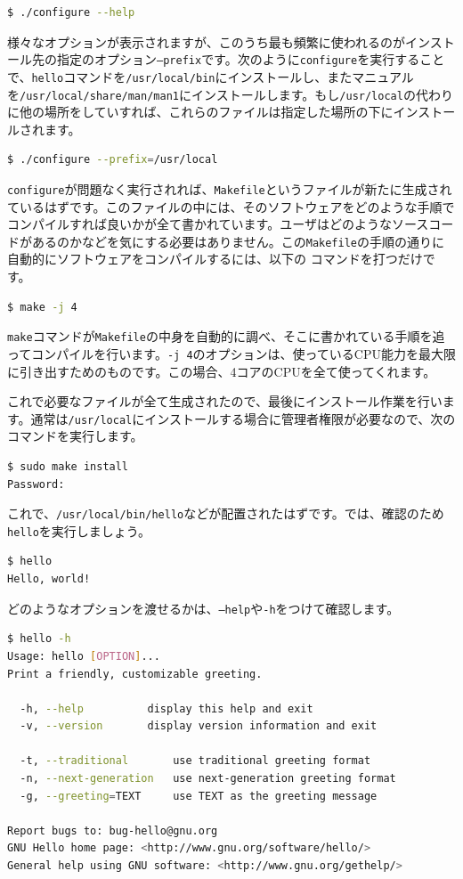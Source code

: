 \begin{lstlisting}[language=bash]
$ ./configure --help
\end{lstlisting}

様々なオプションが表示されますが、このうち最も頻繁に使われるのがインストール先の指定のオプション\texttt{--prefix}です。次のように\texttt{configure}を実行することで、\texttt{hello}コマンドを\texttt{/usr/local/bin}にインストールし、またマニュアルを\texttt{/usr/local/share/man/man1}にインストールします。もし\texttt{/usr/local}の代わりに他の場所をしていすれば、これらのファイルは指定した場所の下にインストールされます。
\begin{lstlisting}[language=bash]
$ ./configure --prefix=/usr/local
\end{lstlisting} 

\texttt{configure}が問題なく実行されれば、\texttt{Makefile}というファイルが新たに生成されているはずです。このファイルの中には、そのソフトウェアをどのような手順でコンパイルすれば良いかが全て書かれています。ユーザはどのようなソースコードがあるのかなどを気にする必要はありません。この\texttt{Makefile}の手順の通りに自動的にソフトウェアをコンパイルするには、以下の
コマンドを打つだけです。

\begin{lstlisting}[language=bash]
$ make -j 4
\end{lstlisting} 

\texttt{make}コマンドが\texttt{Makefile}の中身を自動的に調べ、そこに書かれている手順を追ってコンパイルを行います。\texttt{-j 4}のオプションは、使っているCPU能力を最大限に引き出すためのものです。この場合、4コアのCPUを全て使ってくれます。

これで必要なファイルが全て生成されたので、最後にインストール作業を行います。通常は\texttt{/usr/local}にインストールする場合に管理者権限が必要なので、次のコマンドを実行します。

\begin{lstlisting}[language=bash]
$ sudo make install
Password:
\end{lstlisting}

これで、\texttt{/usr/local/bin/hello}などが配置されたはずです。では、確認のため\texttt{hello}を実行しましょう。 
\begin{lstlisting}[language=bash]
$ hello
Hello, world!
\end{lstlisting}

どのようなオプションを渡せるかは、\texttt{--help}や\texttt{-h}をつけて確認します。
\begin{lstlisting}[language=bash]
$ hello -h
Usage: hello [OPTION]...
Print a friendly, customizable greeting.

  -h, --help          display this help and exit
  -v, --version       display version information and exit

  -t, --traditional       use traditional greeting format
  -n, --next-generation   use next-generation greeting format
  -g, --greeting=TEXT     use TEXT as the greeting message

Report bugs to: bug-hello@gnu.org
GNU Hello home page: <http://www.gnu.org/software/hello/>
General help using GNU software: <http://www.gnu.org/gethelp/>
\end{lstlisting}

